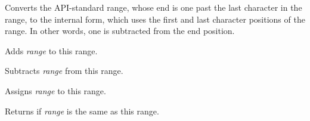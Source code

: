\label{wxrichtextrangetointernal}


Converts the API-standard range, whose end is one past the last character in the range,
to the internal form, which uses the first and last character positions of the range.
In other words, one is subtracted from the end position.

\label{wxrichtextrangeoperatorplus}


Adds {\it range} to this range.

\label{wxrichtextrangeoperatorminus}


Subtracts {\it range} from this range.

\label{wxrichtextrangeoperatorassign}


Assigns {\it range} to this range.

\label{wxrichtextrangeoperatorequal}


Returns \true if {\it range} is the same as this range.

